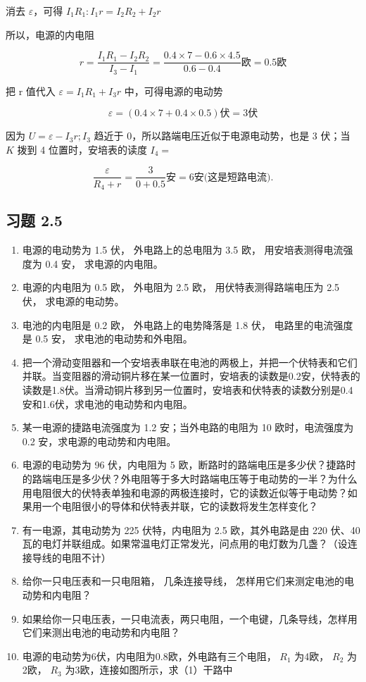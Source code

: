 消去 \(\varepsilon\)，可得 \(I_{1}R_{1}:I_{1}r = I_{2}R_{2} + I_{2}r\)

所以，电源的内电阻

\[
r = \frac{I_{1} R_{1} - I_{2} R_{2}}{I_{3} - I_{1}} = \frac{0.4 \times 7 - 0.6 \times 4.5}{0.6 - 0.4} \text{欧} = 0.5 \text{欧}
\]

把 r 值代入 \(\varepsilon = I_{1} R_{1} + I_{3} r\) 中，可得电源的电动势

\[
\varepsilon = (0.4 \times 7 + 0.4 \times 0.5) \text{伏} = 3 \text{伏}
\]

因为 \(U = \varepsilon - I_3 r; I_3\) 趋近于
0，所以路端电压近似于电源电动势，也是 3 伏；当 \(K\) 拨到 4
位置时，安培表的读度 \(I_4 =\)

\[
\frac{\varepsilon}{R_{4} + r} = \frac{3}{0 + 0.5} \text{安} = 6 \text{安(这是短路电流).}
\]

\subsection{习题 2.5}\label{ux4e60ux9898-2.5}

\begin{enumerate}
\def\labelenumi{\arabic{enumi}.}
\item
  电源的电动势为 1.5 伏， 外电路上的总电阻为 3.5 欧，
  用安培表测得电流强度为 0.4 安， 求电源的内电阻。
\item
  电源的内电阻为 0.5 欧， 外电阻为 2.5 欧， 用伏特表测得路端电压为 2.5
  伏， 求电源的电动势。
\item
  电池的内电阻是 0.2 欧， 外电路上的电势降落是 1.8 伏，
  电路里的电流强度是 0.5 安， 求电池的电动势和外电阻。
\item
  把一个滑动变阻器和一个安培表串联在电池的两极上，并把一个伏特表和它们并联。当变阻器的滑动铜片移在某一位置时，安培表的读数是0.2安，伏特表的读数是1.8伏。当滑动铜片移到另一位置时，安培表和伏特表的读数分别是0.4安和1.6伏，求电池的电动势和内电阻。
\item
  某一电源的捷路电流强度为 1.2 安；当外电路的电阻为 10 欧时，电流强度为
  0.2 安，求电源的电动势和内电阻。
\item
  电源的电动势为 96 伏，内电阻为 5
  欧，断路时的路端电压是多少伏？捷路时的路端电压是多少伏？外电阻等于多大时路端电压等于电动势的一半？为什么用电阻很大的伏特表单独和电源的两极连接时，它的读数近似等于电动势？如果用一个电阻很小的导体和伏特表并联，它的读数将发生怎样变化？
\item
  有一电源，其电动势为 225 伏特，内电阻为 2.5 欧，其外电路是由 220
  伏、40
  瓦的电灯并联组成。如果常温电灯正常发光，问点用的电灯数为几盏？（设连接导线的电阻不计）
\item
  给你一只电压表和一只电阻箱， 几条连接导线，
  怎样用它们来测定电池的电动势和内电阻？
\item
  如果给你一只电压表，一只电流表，两只电阻，一个电键，几条导线，怎样用它们来测出电池的电动势和内电阻？
\item
  电源的电动势为6伏，内电阻为0.8欧，外电路有三个电阻， \(R_{1}\) 为4欧，
  \(R_{2}\) 为2欧， \(R_{3}\) 为3欧，连接如图所示，求（1）干路中
\end{enumerate}

